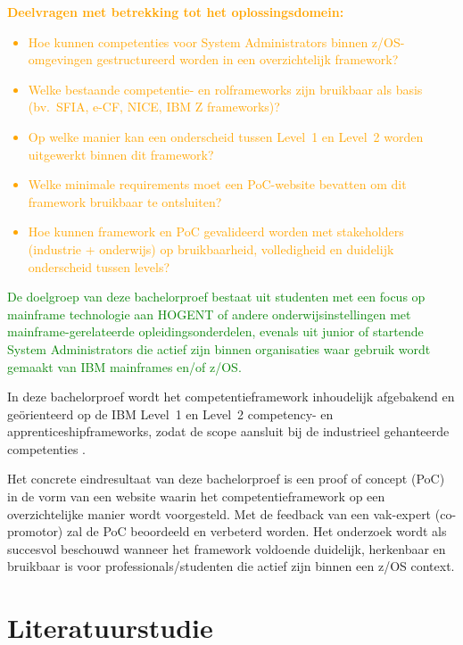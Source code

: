 \textcolor{orange}{\textbf{Deelvragen met betrekking tot het oplossingsdomein:}}
\textcolor{orange}{
		\begin{itemize}
		\item Hoe kunnen competenties voor System Administrators binnen z/OS-omgevingen gestructureerd worden in een overzichtelijk framework?
		\item Welke bestaande competentie- en rolframeworks zijn bruikbaar als basis (bv.\ SFIA, e-CF, NICE, IBM Z frameworks)?
		\item Op welke manier kan een onderscheid tussen Level~1 en Level~2 worden uitgewerkt binnen dit framework?
		\item Welke minimale requirements moet een PoC-website bevatten om dit framework bruikbaar te ontsluiten?
		\item Hoe kunnen framework en PoC gevalideerd worden met stakeholders (industrie + onderwijs) op bruikbaarheid, volledigheid en duidelijk onderscheid tussen levels?
	\end{itemize}
}
\textcolor{green}{
	De doelgroep van deze bachelorproef bestaat uit studenten met een focus op mainframe technologie aan HOGENT of andere onderwijsinstellingen met mainframe-gerelateerde opleidingsonderdelen, evenals uit junior of startende System Administrators die actief zijn binnen organisaties waar gebruik wordt gemaakt van IBM mainframes en/of z/OS.
}

In deze bachelorproef wordt het competentieframework inhoudelijk afgebakend en ge\"orienteerd op de IBM Level~1 en Level~2 competency- en apprenticeshipframeworks, zodat de scope aansluit bij de industrieel gehanteerde competenties \autocite{IBMZSysAdminLevel1,IBMZSysAdminLevel2}.

Het concrete eindresultaat van deze bachelorproef is een proof of concept (PoC) in de vorm van een website waarin het competentieframework op een overzichtelijke manier wordt voorgesteld. Met de feedback van een vak-expert (co-promotor) zal de PoC beoordeeld  en verbeterd worden. Het onderzoek wordt als succesvol beschouwd wanneer het framework voldoende duidelijk, herkenbaar en bruikbaar is voor professionals/studenten die actief zijn binnen een z/OS context.



\section{Literatuurstudie}%
\label{sec:literatuurstudie}

